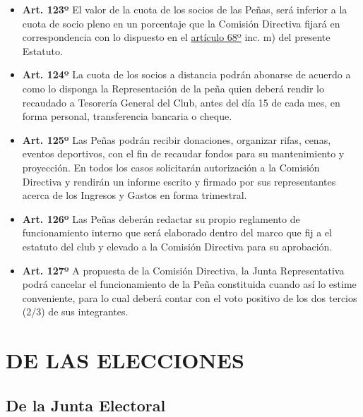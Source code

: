\documentclass[]{book}
\providecommand{\tightlist}{%
  \setlength{\itemsep}{0pt}\setlength{\parskip}{0pt}}
\begin{document}
\begin{itemize}
\item
  \textbf{Art. 123º} El valor de la cuota de los socios de las Peñas,
  será inferior a la cuota de socio pleno en un porcentaje que la
  Comisión Directiva fijará en correspondencia con lo dispuesto en el
  \protect\hyperlink{art68}{artículo 68º} inc. m) del presente Estatuto.
\item
  \textbf{Art. 124º} La cuota de los socios a distancia podrán abonarse
  de acuerdo a como lo disponga la Representación de la peña quien
  deberá rendir lo recaudado a Tesorería General del Club, antes del día
  15 de cada mes, en forma personal, transferencia bancaria o cheque.
\item
  \textbf{Art. 125º} Las Peñas podrán recibir donaciones, organizar
  rifas, cenas, eventos deportivos, con el fin de recaudar fondos para
  su mantenimiento y proyección. En todos los casos solicitarán
  autorización a la Comisión Directiva y rendirán un informe escrito y
  firmado por sus representantes acerca de los Ingresos y Gastos en
  forma trimestral.
\item
  \textbf{Art. 126º} Las Peñas deberán redactar su propio reglamento de
  funcionamiento interno que será elaborado dentro del marco que fij a
  el estatuto del club y elevado a la Comisión Directiva para su
  aprobación.
\end{itemize}

\begin{itemize}
\tightlist
\item
  \textbf{Art. 127º} A propuesta de la Comisión Directiva, la Junta
  Representativa podrá cancelar el funcionamiento de la Peña constituida
  cuando así lo estime conveniente, para lo cual deberá contar con el
  voto positivo de los dos tercios (2/3) de sus integrantes.
\end{itemize}

\hypertarget{cap24}{\chapter{DE LAS ELECCIONES}\label{cap24}}

\section{De la Junta Electoral}\label{de-la-junta-electoral}
\end{document}
